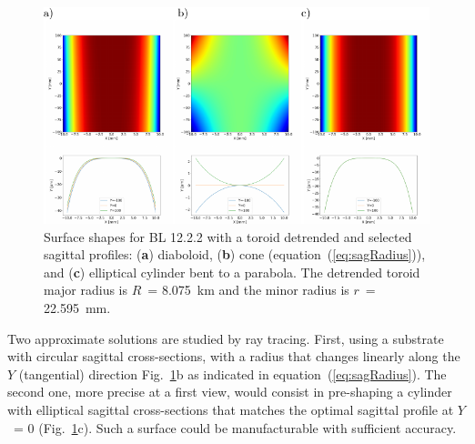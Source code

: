 \documentclass{iucr}       %
\begin{document}
\begin{figure}\label{fig:detrendedBeamline}
\includegraphics[width=1.0\textwidth]{figures/fig8.pdf}
% 

\caption{Surface shapes for BL 12.2.2 with a toroid detrended and selected sagittal profiles: (\textbf{a}) diaboloid, (\textbf{b}) cone (equation~(\ref{eq:sagRadius})), and (\textbf{c}) elliptical cylinder bent to a parabola. The detrended toroid major radius is $R$~= \SI{8.075}{\kilo\meter} and the minor radius is $r$~= \SI{22.595}{\milli\meter}.}
\end{figure}

Two approximate solutions are studied by ray tracing. First, using a substrate with circular sagittal cross-sections, with a radius that changes linearly along the $Y$ (tangential) direction Fig.~\ref{fig:detrendedBeamline}b as indicated in equation~(\ref{eq:sagRadius}). The second one, more precise at a first view, would consist in pre-shaping a cylinder with elliptical sagittal cross-sections that matches the optimal sagittal profile at $Y$~= 0 (Fig.~\ref{fig:detrendedBeamline}c). Such a surface could be manufacturable with sufficient accuracy.
\end{document}
